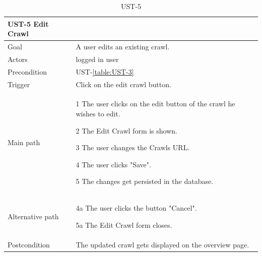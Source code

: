 \documentclass[titlepage, 12pt]{article}
\newenvironment{packed_itemize}{
  \vspace{-\topsep}
  \begin{itemize}
    \setlength{\itemsep}{1pt}
    \setlength{\parskip}{0pt}
    \setlength{\parsep}{0pt}
  }{\end{itemize}}
\begin{document}
  \begin{table}[H]
    \begin{center}
  
      \begin{tabular}{p{4cm}|p{10cm}}
        \textbf{UST-5} \textbf{Edit Crawl}                                            \\
        \hline
        Goal             & A user edits an existing crawl.                  \\
        \hline
        Actors           & logged in user                                               \\
        \hline
        Precondition     & UST-\ref{table:UST-3}                                     \\
        \hline
        Trigger          & Click on the edit crawl button.                            \\
        \hline
        Main path        &
        \begin{packed_itemize}
          \item [1] The user clicks on the edit button of the crawl he wishes to edit.
          \item [2] The Edit Crawl form is shown.
          \item [3] The user changes the Crawls URL.
          \item [4] The user clicks "Save".
          \item [5] The changes get persisted in the database.
        \end{packed_itemize}                                                         \\
        \hline
        Alternative path &
        \begin{packed_itemize}
          \item [4a] The user clicks the button "Cancel".
          \item [5a] The Edit Crawl form closes.
        \end{packed_itemize}                                                         \\
        \hline
        Postcondition    & The updated crawl gets displayed on the overview page. \\
      \end{tabular}

      \vspace{-2mm}
      \caption{UST-5}
      \label{table:UST-5}
  
    \end{center}
  \end{table}
\end{document}
